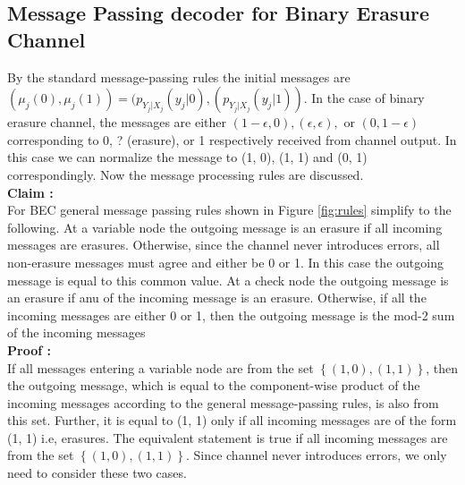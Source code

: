 \subsection{Message Passing decoder for Binary Erasure Channel}
By the standard message-passing rules the initial messages are $(\mu_j(0), \mu_j(1)) = (p_{Y_j|X_j}(y_j|0),(p_{Y_j|X_j}(y_j|1))$. In the case of binary erasure channel, the messages are
either $(1-\epsilon, 0), (\epsilon, \epsilon), \text{ or } (0, 1-\epsilon)$ corresponding to 0, ? (erasure), or 1 respectively received from channel output.
In this case we can normalize the message to (1, 0), (1, 1) and (0, 1) correspondingly. Now the message processing rules are discussed. \\
\textbf{Claim :} \\
For BEC general message passing rules shown in Figure \ref{fig:rules} simplify to the following. At a variable node the outgoing message 
is an erasure if all incoming messages are erasures. Otherwise, since the channel never introduces errors, all non-erasure messages must agree and either be 0 or 1. In this case
the outgoing message is equal to this common value. At a check node the outgoing message is an erasure if anu of the incoming message is an erasure. Otherwise, if all the
incoming messages are either 0 or 1, then the outgoing message is the mod-2 sum of the incoming messages \\
\textbf{Proof :} \\
If all messages entering a variable node are from the set $\left\lbrace(1, 0), (1, 1)\right\rbrace$, then the outgoing message, which is equal to the component-wise
product of the incoming messages according to the general message-passing rules, is also from this set. Further, it is equal to (1, 1) only if all incoming messages are 
of the form (1, 1) i.e, erasures. The equivalent statement is true if all incoming messages are from the set $\left\lbrace(1, 0), (1, 1)\right\rbrace$. Since channel never 
introduces errors, we only need to consider these two cases.